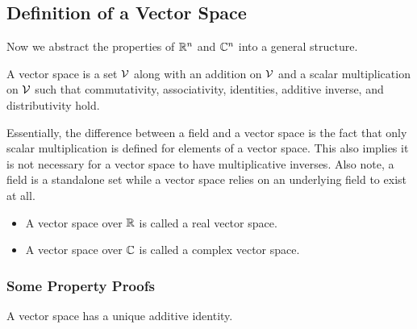 \subsection{Definition of a Vector Space}

Now we abstract the properties of $\mathbb{R}^n$ and $\mathbb{C}^n$ into a general structure.

\begin{definition}
	A vector space is a set $\mathcal{V}$ along with an addition on $\mathcal{V}$ and a scalar multiplication on $\mathcal{V}$ such that commutativity, associativity, identities, additive inverse, and distributivity hold.
\end{definition}
\begin{tcolorbox}[colback=yellow!20, colframe=yellow!80!black, title=My thoughts]
	Essentially, the difference between a field and a vector space is the fact that only scalar multiplication is defined for elements of a vector space. This also implies it is not necessary for a vector space to have multiplicative inverses. Also note, a field is a standalone set while a vector space relies on an underlying field to exist at all.
\end{tcolorbox}
\begin{definition}
\leavevmode
\begin{itemize}
	\item A vector space over $\mathbb{R}$ is called a real vector space.
	\item A vector space over $\mathbb{C}$ is called a complex vector space.
\end{itemize}
\end{definition}
\subsubsection{Some Property Proofs}
\begin{theorem}
	A vector space has a unique additive identity.
\end{theorem}

